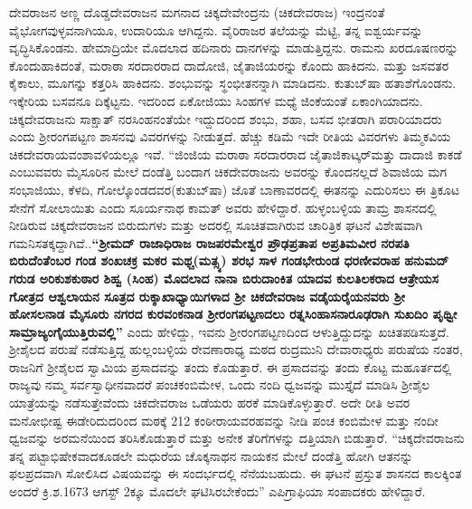ದೇವರಾಜನ ಅಣ್ಣ ದೊಡ್ಡದೇವರಾಜನ ಮಗನಾದ ಚಿಕ್ಕದೇವೇಂದ್ರನು (ಚಿಕದೇವರಾಜ) ಇಂದ್ರನಂತೆ ವೈಭೋಗವುಳ್ಳವ\-ನಾಗಿಯೂ, ಉದಾರಿಯೂ ಆಗಿದ್ದನು. ವೈರಿರಾಜರ ತಲೆಯನ್ನು ಮೆಟ್ಟಿ, ತನ್ನ ಐಶ್ವರ್ಯವನ್ನು ವೃದ್ಧಿಸಿಕೊಂಡನು. ಹೇಮಾದ್ರಿಯೇ ಮೊದಲಾದ ಹದಿನಾರು ದಾನಗಳನ್ನು ಮಾಡುತ್ತಿದ್ದನು. ರಾಮನು ಖರದೂಷಣರನ್ನು ಕೊಂದುಹಾಕಿದಂತೆ, ಮರಾಠಾ ಸರದಾರರಾದ ದಾದೋಜಿ, ಜೈತಾಜಿಯರನ್ನು ಕೊಂದು ಹಾಕಿದನು. ಮತ್ತು ಜಸವತರ ಕೈಕಾಲು, ಮೂಗನ್ನು ಕತ್ತರಿಸಿ ಹಾಕಿದನು. ಶಂಭುವನ್ನು ಸ್ಥಂಭೀತನನ್ನಾಗಿ ಮಾಡಿದನು. ಕುತುಬ್​ಷಾ ಹತಾಶೆಗೊಂಡನು. ಇಕ್ಕೇರಿಯ ಬಸವನೂ ದಿಕ್ಕೆಟ್ಟನು. ಇದರಿಂದ ಏಕೋಜಿಯು ಸಿಂಹಗಳ ಮಧ್ಯೆ ಜಿಂಕೆಯಂತೆ ಏಕಾಂಗಿಯಾದನು. ಚಿಕ್ಕದೇವರಾಜನು ಸಾಕ್ಷಾತ್​ ನರಸಿಂಹನಂತೆಯೇ ಇದ್ದುದರಿಂದ ಶಂಭು, ಶಹಾ, ಬಸವ ಭೀತರಾಗಿ ಪರಾರಿಯಾದರು ಎಂದು ಶ‍್ರೀರಂಗಪಟ್ಟಣ ಶಾಸನವು ವಿವರಗಳನ್ನು ನೀಡುತ್ತದೆ. ಹೆಚ್ಚು ಕಡಿಮೆ ಇದೇ ರೀತಿಯ ವಿವರಗಳು ತಿಮ್ಮಕವಿಯ ಚಿಕದೇವರಾಯವಂಶಾವಳಿಯಲ್ಲೂ ಇವೆ. “ಜಿಂಜಿಯ ಮರಾಠಾ ಸರದಾರರಾದ ಜೈತಾಜಿಕಾಟ್ಕರ್​ ಮತ್ತು ದಾದಾಜಿ ಕಾಕಡೆ ಎಂಬುವವರು ಮೈಸೂರಿನ ಮೇಲೆ ದಂಡೆತ್ತಿ ಬಂದಾಗ ಚಿಕದೇವರಾಜನು ಅವರನ್ನು ಕೊಂದನಲ್ಲದೆ ಶಿವಾಜಿಯ ಮಗ ಸಂಭಾಜಿಯು, ಕೆಳದಿ, ಗೋಲ್ಕೊಂಡದವರ\break (ಕುತುಬ್​ಷಾ) ಜೊತೆ ಬಾಣಾವರದಲ್ಲಿ ಈತನನ್ನು ಎದುರಿಸಲು ಈ ತ್ರಿಕೂಟ ಸೇನೆಗೆ ಸೋಲಾಯಿತು ಎಂದು ಸೂರ್ಯನಾಥ ಕಾಮತ್​ ಅವರು ಹೇಳಿದ್ದಾರೆ. ಹುಳ್ಳಂಬಳ್ಳಿಯ ತಾಮ್ರ ಶಾಸನದಲ್ಲಿ ನೀಡಿರುವ ಚಿಕ್ಕದೇವರಾಜನ ಬಿರುದುಗಳು ಮತ್ತು ಅದರಲ್ಲಿ ಸೂಚಿತವಾಗಿರುವ ಚಾರಿತ್ರಿಕ ಘಟನೆ ವಿಶೇಷವಾಗಿ ಗಮನಿಸತಕ್ಕದ್ದಾಗಿವೆ..\textbf{“ಶ‍್ರೀಮದ್​ ರಾಜಾಧಿರಾಜ ರಾಜಪರಮೇಶ್ವರ ಪ್ರೌಢಪ್ರತಾಪ ಅಪ್ರತಿಮವೀರ ನರಪತಿ ಬಿರುದೆಂತೆಂಬರ ಗಂಡ ಶಂಖಚಕ್ರ ಮಕರ ಮಥ್ಚ(ಮತ್ಸ್ಯ) ಶರಭ ಸಾಳ ಗಂಡಭೇರುಂಡ ಧರಣೀವರಾಹ ಹನುಮದ್​ಗರುಡ ಅರಿಕುಶಕುಠಾರ ಶಿಹ್ವ (ಸಿಂಹ) ಮೊದಲಾದ ನಾನಾ ಬಿರುದಾಂಕಿತ ಯಾದವ ಕುಲತಿಲಕರಾದ ಆತ್ರೇಯಸ ಗೋತ್ರದ ಆಶ್ವಲಾಯನ ಸೂತ್ರದ ರುಕ್ಶಾಖಾಧ್ಯಾಯಿಗಳಾದ ಶ‍್ರೀ ಚಿಕದೇವರಾಜ ವಡೈಯರೈಯನವರು ಶ‍್ರೀ ಹೋಸಲನಾಡ ಮೈಸೂರು ನಗರದ ಕುರವಂಕನಾಡ ಶ‍್ರೀರಂಗಪಟ್ಟಣದಲು ರತ್ನಸಿಂಹಾಸನಾರೂಢರಾಗಿ ಸುಖದಿಂ ಪೃಥ್ವೀ ಸಾಮ್ರಾಜ್ಯಂಗೈಯುತ್ತಿರುವಲ್ಲಿ”} ಎಂದು ಹೇಳಿದ್ದು, ಇವನು ಶ‍್ರೀರಂಗಪಟ್ಟಣದಿಂದ ಆಳುತ್ತಿದ್ದುದನ್ನು ಖಚಿತಪಡಿಸುತ್ತದೆ. ಶ‍್ರೀಶೈಲದ ಪರುಷೆ ನಡೆಸುತ್ತಿದ್ದ ಹುಲ್ಲಂಬಳ್ಳಿಯ ರೇವಣಾರಾಧ್ಯ ಮಠದ ರುದ್ರಮುನಿ ದೇವಾರಾಧ್ಯರು ಪರುಷೆಯ ನಂತರ, ರಾಜನಿಗೆ ಶ‍್ರೀಶೈಲದ ಸ್ವಾಮಿಯ ಪ್ರಸಾದವನ್ನು ತಂದು ಕೊಡುತ್ತಾರೆ. ಈ ಪ್ರಸಾದವನ್ನು ತಂದು ಕೊಟ್ಟ ಮಹೂರ್ತದಲ್ಲಿ ರಾಜ್ಯವು ನಮ್ಮ ಸರ್ವಸ್ವಾಧೀನವಾದರೆ ಪಂಚಕಂಬಿಮೇಳ, ಒಂದು ನಂದಿ ಧ್ವಜವನ್ನು ಮುಸ್ತೈದೆ ಮಾಡಿಸಿ ಶ‍್ರೀಶೈಲ ಯಾತ್ರೆಯನ್ನು ನಡೆಸುತ್ತೇವೆಂದು ಚಿಕದೇವರಾಜ ಒಡೆಯರು ಹರಕೆ ಮಾಡಿಕೊಳ್ಳುತ್ತಾರೆ. ಅದೇ ರೀತಿ ಅವರ ಮನೋಭೀಷ್ಟ ಈಡೇರಿದುದರಿಂದ ಮಠಕ್ಕೆ 212 ಕಂಠೀರಾಯವರಹವನ್ನು ನೀಡಿ ಪಂಚ ಕಂಬಿಮೇಳ ಮತ್ತು ನಂದೀ ಧ್ವಜವನ್ನು ಅರಮನೆಯಿಂದ ತರಿಸಿಕೊಡುತ್ತಾರೆ ಮತ್ತು ಅನೇಕ ತೆರಿಗೆಗಳನ್ನು ದತ್ತಿಯಾಗಿ ಬಿಡುತ್ತಾರೆ. “ಚಿಕ್ಕದೇವರಾಜನು ತನ್ನ ಪಟ್ಟಾಭಿಷೇಕವಾದಕೂಡಲೇ ಮಧುರೆಯ ಚೊಕ್ಕನಾಥನ ನಾಯಕನ ಮೇಲೆ ದಂಡೆತ್ತಿ ಹೋಗಿ ಆತನನ್ನು ಫಲಪ್ರದವಾಗಿ ಸೋಲಿಸಿದ ವಿಷಯವನ್ನು ಈ ಸಂದರ್ಭದಲ್ಲಿ ನೆನೆಯಬಹುದು. ಈ ಘಟನೆ ಪ್ರಸ್ತುತ ಶಾಸನದ ಕಾಲಕ್ಕಿಂತ ಅಂದರೆ ಕ್ರಿ.ಶ.1673 ಆಗಸ್ಟ್​ 2ಕ್ಕೂ ಮೊದಲೇ ಘಟಿಸಿರಬೇಕೆಂದು” ಎಪಿಗ್ರಾಫಿಯಾ ಸಂಪಾದಕರು ಹೇಳಿದ್ದಾರೆ.

